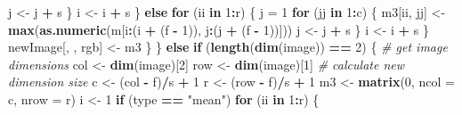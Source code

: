 \documentclass[12pt,]{krantz}
\makeatletter
\newenvironment{Shaded}{\begin{snugshade}}{\end{snugshade}}
\newcommand{\CommentTok}[1]{\textcolor[rgb]{0.37,0.37,0.37}{\textit{#1}}}
\newcommand{\ControlFlowTok}[1]{\textcolor[rgb]{0.27,0.27,0.27}{\textbf{#1}}}
\newcommand{\DataTypeTok}[1]{\textcolor[rgb]{0.27,0.27,0.27}{#1}}
\newcommand{\DecValTok}[1]{\textcolor[rgb]{0.06,0.06,0.06}{#1}}
\newcommand{\KeywordTok}[1]{\textcolor[rgb]{0.27,0.27,0.27}{\textbf{#1}}}
\newcommand{\NormalTok}[1]{#1}
\newcommand{\OperatorTok}[1]{\textcolor[rgb]{0.43,0.43,0.43}{\textbf{#1}}}
\newcommand{\StringTok}[1]{\textcolor[rgb]{0.5,0.5,0.5}{#1}}
\newenvironment{kframe}{%
\medskip{}
\setlength{\fboxsep}{.8em}
 \def\at@end@of@kframe{}%
 \ifinner\ifhmode%
  \def\at@end@of@kframe{\end{minipage}}%
  \begin{minipage}{\columnwidth}%
 \fi\fi%
 \def\FrameCommand##1{\hskip\@totalleftmargin \hskip-\fboxsep
 \colorbox{shadecolor}{##1}\hskip-\fboxsep
     \hskip-\linewidth \hskip-\@totalleftmargin \hskip\columnwidth}%
 \MakeFramed {\advance\hsize-\width
   \@totalleftmargin\z@ \linewidth\hsize
   \@setminipage}}%
 {\par\unskip\endMakeFramed%
 \at@end@of@kframe}
\renewenvironment{Shaded}{\begin{kframe}}{\end{kframe}}
\makeatother
\begin{document}
\begin{Shaded}
\begin{Highlighting}[]
\NormalTok{                    j <-}\StringTok{ }\NormalTok{j }\OperatorTok{+}\StringTok{ }\NormalTok{s}
\NormalTok{                  \}}
\NormalTok{                  i <-}\StringTok{ }\NormalTok{i }\OperatorTok{+}\StringTok{ }\NormalTok{s}
\NormalTok{                \} }\ControlFlowTok{else} \ControlFlowTok{for}\NormalTok{ (ii }\ControlFlowTok{in} \DecValTok{1}\OperatorTok{:}\NormalTok{r) \{}
\NormalTok{                j =}\StringTok{ }\DecValTok{1}
                \ControlFlowTok{for}\NormalTok{ (jj }\ControlFlowTok{in} \DecValTok{1}\OperatorTok{:}\NormalTok{c) \{}
\NormalTok{                  m3[ii, jj] <-}\StringTok{ }\KeywordTok{max}\NormalTok{(}\KeywordTok{as.numeric}\NormalTok{(m[i}\OperatorTok{:}\NormalTok{(i }\OperatorTok{+}\StringTok{ }
\StringTok{                    }\NormalTok{(f }\OperatorTok{-}\StringTok{ }\DecValTok{1}\NormalTok{)), j}\OperatorTok{:}\NormalTok{(j }\OperatorTok{+}\StringTok{ }\NormalTok{(f }\OperatorTok{-}\StringTok{ }\DecValTok{1}\NormalTok{))]))}
\NormalTok{                  j <-}\StringTok{ }\NormalTok{j }\OperatorTok{+}\StringTok{ }\NormalTok{s}
\NormalTok{                \}}
\NormalTok{                i <-}\StringTok{ }\NormalTok{i }\OperatorTok{+}\StringTok{ }\NormalTok{s}
\NormalTok{            \}}
\NormalTok{            newImage[, , rgb] <-}\StringTok{ }\NormalTok{m3}
\NormalTok{        \}}
\NormalTok{    \} }\ControlFlowTok{else} \ControlFlowTok{if}\NormalTok{ (}\KeywordTok{length}\NormalTok{(}\KeywordTok{dim}\NormalTok{(image)) }\OperatorTok{==}\StringTok{ }\DecValTok{2}\NormalTok{) \{}
        \CommentTok{# get image dimensions}
\NormalTok{        col <-}\StringTok{ }\KeywordTok{dim}\NormalTok{(image)[}\DecValTok{2}\NormalTok{]}
\NormalTok{        row <-}\StringTok{ }\KeywordTok{dim}\NormalTok{(image)[}\DecValTok{1}\NormalTok{]}
        \CommentTok{# calculate new dimension size}
\NormalTok{        c <-}\StringTok{ }\NormalTok{(col }\OperatorTok{-}\StringTok{ }\NormalTok{f)}\OperatorTok{/}\NormalTok{s }\OperatorTok{+}\StringTok{ }\DecValTok{1}
\NormalTok{        r <-}\StringTok{ }\NormalTok{(row }\OperatorTok{-}\StringTok{ }\NormalTok{f)}\OperatorTok{/}\NormalTok{s }\OperatorTok{+}\StringTok{ }\DecValTok{1}
\NormalTok{        m3 <-}\StringTok{ }\KeywordTok{matrix}\NormalTok{(}\DecValTok{0}\NormalTok{, }\DataTypeTok{ncol =}\NormalTok{ c, }\DataTypeTok{nrow =}\NormalTok{ r)}
\NormalTok{        i <-}\StringTok{ }\DecValTok{1}
        \ControlFlowTok{if}\NormalTok{ (type }\OperatorTok{==}\StringTok{ "mean"}\NormalTok{) }
            \ControlFlowTok{for}\NormalTok{ (ii }\ControlFlowTok{in} \DecValTok{1}\OperatorTok{:}\NormalTok{r) \{}

\end{Highlighting}
\end{Shaded}
\end{document}
